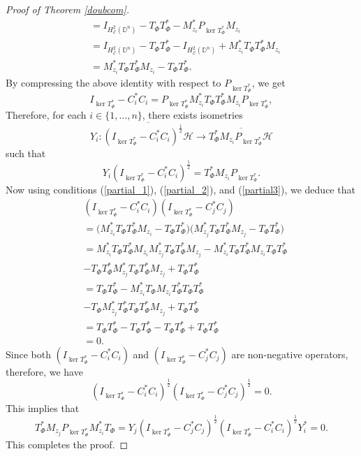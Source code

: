 \documentclass[12pt]{amsart}
\theoremstyle{definition}
\newcommand{\D}{\mathbb{D}}
\newcommand{\1}{{\mbox{\bf 1}}}
\newcommand{\cle}{\mathcal{E}}
\newcommand{\clh}{\mathcal{H}}
\newcommand{\raro}{\rightarrow}
\begin{document}
\begin{proof}[Proof of Theorem \ref{doubcom}]
\begin{align*}
&= I_{H_{\cle}^2(\D^n)}  - T_{\Phi}T_{\Phi}^* - M_{z_i}^* P_{\ker T_{\Phi}^*}M_{z_i} \\
&= I_{H_{\cle}^2(\D^n)}  - T_{\Phi}T_{\Phi}^* - I_{H_{\cle}^2(\D^n)} + M_{z_i}^* T_{\Phi}T_{\Phi}^*M_{z_i} \\
&=  M_{z_i}^* T_{\Phi}T_{\Phi}^*M_{z_i}   - T_{\Phi}T_{\Phi}^*.
\end{align*}
By compressing the above identity with respect to $P_{\ker T_{\Phi}^*}$, we get
\[
I_{\ker T_{\Phi}^*} - C_i ^* C_i = P_{\ker T_{\Phi}^*} M_{z_i}^* T_{\Phi}T_{\Phi}^*M_{z_i} P_{\ker T_{\Phi}^*},
\]
Therefore, for each $i \in \{1,\ldots,n\}$, there exists isometries
\[
Y_i: \overline{(I_{\ker T_{\Phi}^*} - C_i^* C_i)^{\frac{1}{2}} \clh} \raro \overline{T_{\Phi}^*M_{z_i} P_{\ker T_{\Phi}^*} \clh}
\]
such that 
\[
Y_i (I_{\ker T_{\Phi}^*} - C_i^* C_i)^{\frac{1}{2}} = T_{\Phi}^*M_{z_i} P_{\ker T_{\Phi}^*}.
\]
Now using conditions (\ref{partial_1}), (\ref{partial_2}), and (\ref{partial3}), we deduce that
\begin{align*}
&(I_{\ker T_{\Phi}^*} - C_i^* C_i)  (I_{\ker T_{\Phi}^*} - C_j^* C_j) \\
&= \big(M_{z_i}^* T_{\Phi}T_{\Phi}^*M_{z_i}   - T_{\Phi}T_{\Phi}^* \big) \big(M_{z_j}^* T_{\Phi}T_{\Phi}^*M_{z_j}   - T_{\Phi}T_{\Phi}^* \big)\\
&= M_{z_i}^* T_{\Phi}T_{\Phi}^*M_{z_i} M_{z_j}^* T_{\Phi}T_{\Phi}^*M_{z_j}   - M_{z_i}^* T_{\Phi}T_{\Phi}^*M_{z_i} T_{\Phi}T_{\Phi}^*  \\
&- T_{\Phi}T_{\Phi}^*  M_{z_j}^* T_{\Phi}T_{\Phi}^*M_{z_j}  +  T_{\Phi}T_{\Phi}^* \\
&=  T_{\Phi}T_{\Phi}^*  - M_{z_i}^* T_{\Phi}M_{z_i} T_{\Phi}^* T_{\Phi}T_{\Phi}^*  \\
&- T_{\Phi}  M_{z_j}^* T_{\Phi}^* T_{\Phi}T_{\Phi}^*M_{z_j}  +  T_{\Phi}T_{\Phi}^* \\
&=  T_{\Phi}T_{\Phi}^*  -  T_{\Phi} T_{\Phi}^* - T_{\Phi}  T_{\Phi}^* +  T_{\Phi}T_{\Phi}^* \\
&=0.
\end{align*}
Since both $(I_{\ker T_{\Phi}^*} - C_i^* C_i)$ and $(I_{\ker T_{\Phi}^*} - C_j^* C_j)$ are non-negative operators, therefore, we have 
\[
(I_{\ker T_{\Phi}^*} - C_i^* C_i)^{\frac{1}{2}}  (I_{\ker T_{\Phi}^*} - C_j^* C_j)^{\frac{1}{2}} = 0.
\]
This implies that 
\[
T_{\Phi}^*M_{z_j} P_{\ker T_{\Phi}^*} M_{z_i}^* T_{\Phi} = Y_j (I_{\ker T_{\Phi}^*} - C_j^* C_j)^{\frac{1}{2}} (I_{\ker T_{\Phi}^*} - C_i^* C_i)^{\frac{1}{2}} Y_i^* = 0.
\]
This completes the proof.
\end{proof}
\end{document}
